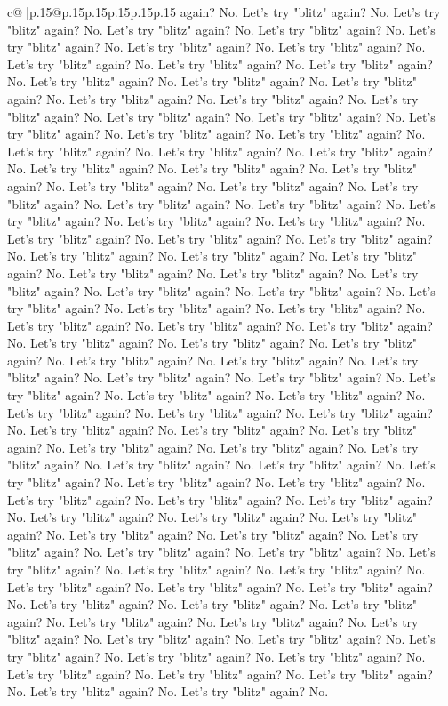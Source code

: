 \documentclass{article}
\begin{document}
{\begin{supertabular}{c@{$\;$}|p{.15\linewidth}@{}p{.15\linewidth}p{.15\linewidth}p{.15\linewidth}p{.15\linewidth}p{.15\linewidth}}
{{{again? No. Let's try "blitz" again? No. Let's try "blitz" again? No. Let's try "blitz" again? No. Let's try "blitz" again? No. Let's try "blitz" again? No. Let's try "blitz" again? No. Let's try "blitz" again? No. Let's try "blitz" again? No. Let's try "blitz" again? No. Let's try "blitz" again? No. Let's try "blitz" again? No. Let's try "blitz" again? No. Let's try "blitz" again? No. Let's try "blitz" again? No. Let's try "blitz" again? No. Let's try "blitz" again? No. Let's try "blitz" again? No. Let's try "blitz" again? No. Let's try "blitz" again? No. Let's try "blitz" again? No. Let's try "blitz" again? No. Let's try "blitz" again? No. Let's try "blitz" again? No. Let's try "blitz" again? No. Let's try "blitz" again? No. Let's try "blitz" again? No. Let's try "blitz" again? No. Let's try "blitz" again? No. Let's try "blitz" again? No. Let's try "blitz" again? No. Let's try "blitz" again? No. Let's try "blitz" again? No. Let's try "blitz" again? No. Let's try "blitz" again? No. Let's try "blitz" again? No. Let's try "blitz" again? No. Let's try "blitz" again? No. Let's try "blitz" again? No. Let's try "blitz" again? No. Let's try "blitz" again? No. Let's try "blitz" again? No. Let's try "blitz" again? No. Let's try "blitz" again? No. Let's try "blitz" again? No. Let's try "blitz" again? No. Let's try "blitz" again? No. Let's try "blitz" again? No. Let's try "blitz" again? No. Let's try "blitz" again? No. Let's try "blitz" again? No. Let's try "blitz" again? No. Let's try "blitz" again? No. Let's try "blitz" again? No. Let's try "blitz" again? No. Let's try "blitz" again? No. Let's try "blitz" again? No. Let's try "blitz" again? No. Let's try "blitz" again? No. Let's try "blitz" again? No. Let's try "blitz" again? No. Let's try "blitz" again? No. Let's try "blitz" again? No. Let's try "blitz" again? No. Let's try "blitz" again? No. Let's try "blitz" again? No. Let's try "blitz" again? No. Let's try "blitz" again? No. Let's try "blitz" again? No. Let's try "blitz" again? No. Let's try "blitz" again? No. Let's try "blitz" again? No. Let's try "blitz" again? No. Let's try "blitz" again? No. Let's try "blitz" again? No. Let's try "blitz" again? No. Let's try "blitz" again? No. Let's try "blitz" again? No. Let's try "blitz" again? No. Let's try "blitz" again? No. Let's try "blitz" again? No. Let's try "blitz" again? No. Let's try "blitz" again? No. Let's try "blitz" again? No. Let's try "blitz" again? No. Let's try "blitz" again? No. Let's try "blitz" again? No. Let's try "blitz" again? No. Let's try "blitz" again? No. Let's try "blitz" again? No. Let's try "blitz" again? No. Let's try "blitz" again? No. Let's try "blitz" again? No. Let's try "blitz" again? No. Let's try "blitz" again? No. Let's try "blitz" again? No. Let's try "blitz" again? No. Let's try "blitz" again? No. Let's try "blitz" again? No. Let's try "blitz" again? No. Let's try "blitz" again? No. Let's try "blitz" again? No. Let's try "blitz" again? No. Let's try "blitz" again? No. Let's try "blitz" again? No. Let's try "blitz" again? No. Let's try "blitz" again? No. Let's try "blitz" again? No. Let's try "blitz" again? No. Let's try "blitz" again? No. Let's try "blitz" again? No. }}}
\end{supertabular}}
\end{document}
